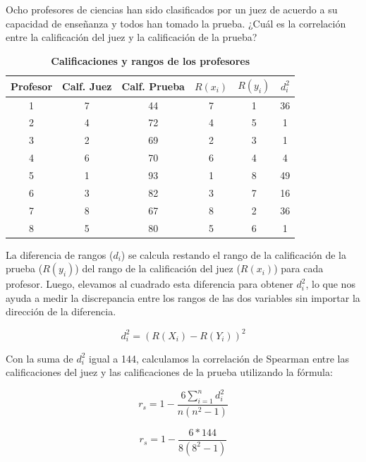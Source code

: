 \documentclass{article}
\begin{document}
Ocho profesores de ciencias han sido clasificados por un juez de acuerdo a su capacidad de enseñanza y todos han tomado la prueba. ¿Cuál es la correlación entre la calificación del juez y la calificación de la prueba?

\begin{table}[ht]
    \centering
    \caption{\textbf{Calificaciones y rangos de los profesores}}
    \begin{tabular}{cccccc}
        \toprule
        Profesor & Calf. Juez & Calf. Prueba & $R(x_i)$ & $R(y_i)$ & $d_i^2$ \\
        \midrule
        1        & 7          & 44           & 7        & 1        & 36      \\
        2        & 4          & 72           & 4        & 5        & 1       \\
        3        & 2          & 69           & 2        & 3        & 1       \\
        4        & 6          & 70           & 6        & 4        & 4       \\
        5        & 1          & 93           & 1        & 8        & 49      \\
        6        & 3          & 82           & 3        & 7        & 16      \\
        7        & 8          & 67           & 8        & 2        & 36      \\
        8        & 5          & 80           & 5        & 6        & 1       \\
        \bottomrule
    \end{tabular}
\end{table}

La diferencia de rangos (\(d_i\)) se calcula restando el rango de la calificación de la prueba (\(R(y_i)\)) del rango de la calificación del juez (\(R(x_i)\)) para cada profesor. Luego, elevamos al cuadrado esta diferencia para obtener \(d_i^2\), lo que nos ayuda a medir la discrepancia entre los rangos de las dos variables sin importar la dirección de la diferencia.

\[d_i^2 = (R(X_i) - R(Y_i))^2\]

Con la suma de $d_i^2$ igual a 144, calculamos la correlación de Spearman entre las calificaciones del juez y las calificaciones de la prueba utilizando la fórmula:


\[r_s = 1 - \frac{6 \sum_{i=1}^{n}d_i^2}{n(n^2 - 1)}\]

\[r_s = 1 - \frac{6 * 144}{8(8^2 - 1)}\]
\end{document}

